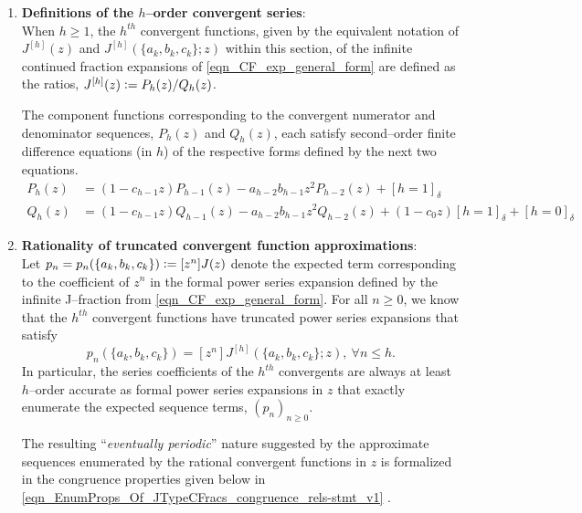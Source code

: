 \documentclass[12pt,reqno]{article}
\numberwithin{sfootnote}{section}
\numberwithin{equation}{section}
\newcommand{\itemlabel}[1]{\textbf{#1}: \\ }
\theoremstyle{DefaultTheoremStyle}
\theoremstyle{definition}
\newcommand{\quotetext}[1]{``#1''}
\newcommand{\defequals}{\ensuremath{\vcentcolon=}}
\newcommand{\Iverson}[1]{\ensuremath{\left[#1\right]_{\delta}}}
\begin{document}
\begin{enumerate} 
     \setlength{\itemsep}{-1mm} 

\item \itemlabel{Definitions of the $h$--order convergent series} 
When $h \geq 1$, the $h^{th}$ convergent functions, 
given by the equivalent notation of 
$J^{[h]}(z)$ and $J^{[h]}(\{a_k, b_k, c_k\}; z)$ within this section, 
of the infinite continued fraction expansions of 
\eqref{eqn_CF_exp_general_form} 
are defined as the ratios, $J^{[h]}(z) \defequals P_h(z) / Q_h(z)$. 

The component functions corresponding to the convergent 
numerator and denominator sequences, $P_h(z)$ and $Q_h(z)$, 
each satisfy second--order 
finite difference equations (in $h$) of the respective forms 
defined by the next two equations. 
\begin{align*} 
P_h(z) & = (1-c_{h-1} z) P_{h-1}(z)-a_{h-2}b_{h-1} z^2 P_{h-2}(z) + 
           \Iverson{h = 1} \\ 
Q_h(z) & = (1-c_{h-1} z) Q_{h-1}(z)-a_{h-2}b_{h-1} z^2 Q_{h-2}(z) + 
           (1-c_0 z) \Iverson{h = 1}+\Iverson{h=0} 
\end{align*} 

\item \itemlabel{Rationality of truncated convergent function approximations} 
Let $p_n = p_n(\{a_k, b_k, c_k\}) \defequals [z^n] J(z)$ 
denote the expected term corresponding to the coefficient of $z^n$ in the 
formal power series expansion defined by the infinite J--fraction from 
\eqref{eqn_CF_exp_general_form}. 
For all $n \geq 0$, we know that the $h^{th}$ convergent functions 
have truncated power series expansions that satisfy 
\begin{equation*} 
p_n(\{a_k, b_k, c_k\}) = [z^n] J^{[h]}(\{a_k, b_k, c_k\}; z),\ 
     \forall n \leq h. 
\end{equation*} 
In particular, the series coefficients of the $h^{th}$ convergents are 
always at least $h$--order accurate as formal power series 
expansions in $z$ that exactly enumerate the expected sequence terms, 
$\left(p_n\right)_{n \geq 0}$. 

The resulting \quotetext{\emph{eventually periodic}} nature 
suggested by the approximate sequences enumerated by 
the rational convergent functions in $z$ is formalized in the 
congruence properties given below in 
\eqref{eqn_EnumProps_Of_JTypeCFracs_congruence_rels-stmt_v1} 
\citep{FLAJOLET82} \citep[See \S 2, \S 5.7]{GFLECT}. 


\end{enumerate}
\end{document}
